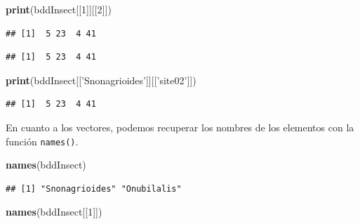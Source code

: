 \documentclass[]{book}
\newenvironment{Shaded}{\begin{snugshade}}{\end{snugshade}}
\newcommand{\KeywordTok}[1]{\textcolor[rgb]{0.13,0.29,0.53}{\textbf{#1}}}
\newcommand{\DecValTok}[1]{\textcolor[rgb]{0.00,0.00,0.81}{#1}}
\newcommand{\StringTok}[1]{\textcolor[rgb]{0.31,0.60,0.02}{#1}}
\newcommand{\OperatorTok}[1]{\textcolor[rgb]{0.81,0.36,0.00}{\textbf{#1}}}
\newcommand{\NormalTok}[1]{#1}
\begin{document}
\begin{Shaded}
\begin{Highlighting}[]
\KeywordTok{print}\NormalTok{(bddInsect[[}\DecValTok{1}\NormalTok{]][[}\DecValTok{2}\NormalTok{]])}
\end{Highlighting}
\end{Shaded}

\begin{verbatim}
## [1]  5 23  4 41
\end{verbatim}

\begin{Shaded}
\end{Shaded}

\begin{verbatim}
## [1]  5 23  4 41
\end{verbatim}

\begin{Shaded}
\begin{Highlighting}[]
\KeywordTok{print}\NormalTok{(bddInsect[[}\StringTok{'Snonagrioides'}\NormalTok{]][[}\StringTok{'site02'}\NormalTok{]])}
\end{Highlighting}
\end{Shaded}

\begin{verbatim}
## [1]  5 23  4 41
\end{verbatim}

En cuanto a los vectores, podemos recuperar los nombres de los elementos
con la función \texttt{names()}.

\begin{Shaded}
\begin{Highlighting}[]
\KeywordTok{names}\NormalTok{(bddInsect)}
\end{Highlighting}
\end{Shaded}

\begin{verbatim}
## [1] "Snonagrioides" "Onubilalis"
\end{verbatim}

\begin{Shaded}
\begin{Highlighting}[]
\KeywordTok{names}\NormalTok{(bddInsect[[}\DecValTok{1}\NormalTok{]])}
\end{Highlighting}
\end{Shaded}
\end{document}
